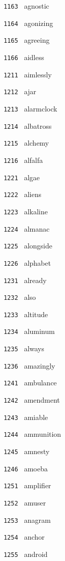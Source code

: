 \documentclass[11pt]{article}
\begin{document}
\begin{multicols}{6}
\noindent \texttt{ 1163 } agnostic  \par
\noindent \texttt{ 1164 } agonizing  \par
\noindent \texttt{ 1165 } agreeing  \par
\noindent \texttt{ 1166 } aidless  \par
\noindent \texttt{ 1211 } aimlessly  \par
\noindent \texttt{ 1212 } ajar  \par
\noindent \texttt{ 1213 } alarmclock  \par
\noindent \texttt{ 1214 } albatross  \par
\noindent \texttt{ 1215 } alchemy  \par
\noindent \texttt{ 1216 } alfalfa  \par
\noindent \texttt{ 1221 } algae  \par
\noindent \texttt{ 1222 } aliens  \par
\noindent \texttt{ 1223 } alkaline  \par
\noindent \texttt{ 1224 } almanac  \par
\noindent \texttt{ 1225 } alongside  \par
\noindent \texttt{ 1226 } alphabet  \par
\noindent \texttt{ 1231 } already  \par
\noindent \texttt{ 1232 } also  \par
\noindent \texttt{ 1233 } altitude  \par
\noindent \texttt{ 1234 } aluminum  \par
\noindent \texttt{ 1235 } always  \par
\noindent \texttt{ 1236 } amazingly  \par
\noindent \texttt{ 1241 } ambulance  \par
\noindent \texttt{ 1242 } amendment  \par
\noindent \texttt{ 1243 } amiable  \par
\noindent \texttt{ 1244 } ammunition  \par
\noindent \texttt{ 1245 } amnesty  \par
\noindent \texttt{ 1246 } amoeba  \par
\noindent \texttt{ 1251 } amplifier  \par
\noindent \texttt{ 1252 } amuser  \par
\noindent \texttt{ 1253 } anagram  \par
\noindent \texttt{ 1254 } anchor  \par
\noindent \texttt{ 1255 } android  \par

\end{multicols}
\end{document}
